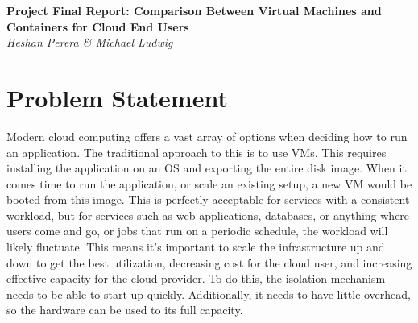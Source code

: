 \documentclass[11pt]{article}
\begin{document}
\renewcommand{\headrulewidth}{0pt} 
\renewcommand{\footrulewidth}{0pt} 
\pagestyle{fancy}
\cfoot{}
\lhead{}
\rhead{}
\lfoot{\itshape\textcolor{gray}{CS525T Cloud Computing Final Report}}

\begin{center}
{\LARGE \bf Project Final Report: Comparison Between Virtual Machines and Containers for Cloud End Users} \\
{\normalsize \emph{Heshan Perera \& Michael Ludwig}}\\
\end{center}



\vspace{3mm} %

\section{Problem Statement}

Modern cloud computing offers a vast array of options when deciding how to run an application. The traditional approach to this is to use VMs. This requires installing the application on an OS and exporting the entire disk image. When it comes time to run the application, or scale an existing setup, a new VM would be booted from this image. This is perfectly acceptable for services with a consistent workload, but for services such as web applications, databases, or anything where users come and go, or jobs that run on a periodic schedule, the workload will likely fluctuate. This means it's important to scale the infrastructure up and down to get the best utilization, decreasing cost for the cloud user, and increasing effective capacity for the cloud provider. To do this, the isolation mechanism needs to be able to start up quickly. Additionally, it needs to have little overhead, so the hardware can be used to its full capacity.
\end{document}
